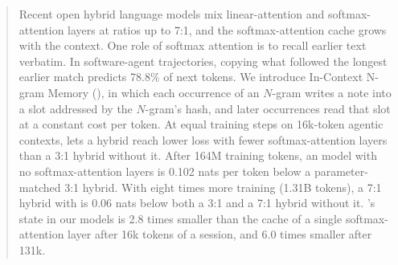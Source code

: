 \begin{abstract}
Recent open hybrid language models mix linear-attention and softmax-attention layers at ratios
up to 7:1, and the softmax-attention cache grows with the context. One role of softmax
attention is to recall earlier text verbatim. In software-agent trajectories, copying what
followed the longest earlier match predicts 78.8\% of next tokens. We introduce In-Context N-gram
Memory (\ingram{}), in which each occurrence of an $N$-gram writes a note into a slot addressed by
the $N$-gram's hash, and later occurrences read that slot at a constant cost per token. At equal
training steps on 16k-token agentic contexts, \ingram{} lets a hybrid reach lower loss with fewer softmax-attention layers
than a 3:1 hybrid without it. After 164M training tokens, an \ingram{} model with no
softmax-attention layers is 0.102 nats per token below a parameter-matched 3:1 hybrid. With eight
times more training (1.31B tokens), a 7:1 hybrid with \ingram{} is 0.06 nats below both a 3:1 and
a 7:1 hybrid without it. \ingram{}'s state in our models is 2.8 times smaller than the cache of a single
softmax-attention layer after 16k tokens of a session, and 6.0 times smaller after 131k.
\end{abstract}
